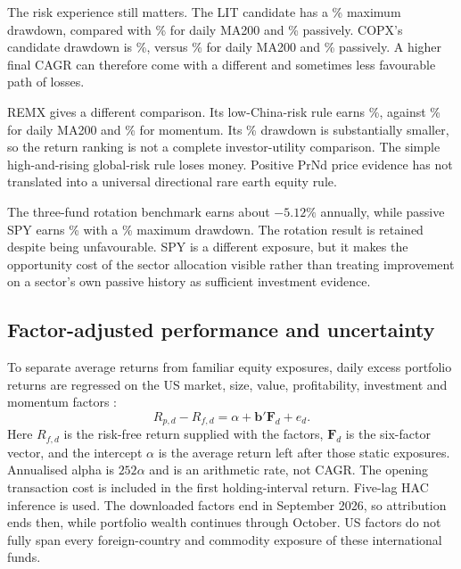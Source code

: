 The risk experience still matters. The LIT candidate has a \OosLitAvoidDrawdown\% maximum drawdown, compared with \OosLitDailyMADrawdown\% for daily MA200 and \OosLitPassiveDrawdown\% passively. COPX's candidate drawdown is \OosCopxAvoidDrawdown\%, versus \OosCopxDailyMADrawdown\% for daily MA200 and \OosCopxPassiveDrawdown\% passively. A higher final CAGR can therefore come with a different and sometimes less favourable path of losses.


REMX gives a different comparison. Its low-China-risk rule earns \OosRemxLowCagr\%, against \OosRemxDailyMACagr\% for daily MA200 and \OosRemxMomentumCagr\% for momentum. Its \OosRemxLowDrawdown\% drawdown is substantially smaller, so the return ranking is not a complete investor-utility comparison. The simple high-and-rising global-risk rule loses money. Positive PrNd price evidence has not translated into a universal directional rare earth equity rule.

The three-fund rotation benchmark earns about $-5.12\%$ annually, while passive SPY earns \OosSpyPassiveCagr\% with a \OosSpyPassiveDrawdown\% maximum drawdown. The rotation result is retained despite being unfavourable. SPY is a different exposure, but it makes the opportunity cost of the sector allocation visible rather than treating improvement on a sector's own passive history as sufficient investment evidence.

\subsection{Factor-adjusted performance and uncertainty}

To separate average returns from familiar equity exposures, daily excess portfolio returns are regressed on the US market, size, value, profitability, investment and momentum factors \citep{fama2015,french2026}:
\begin{equation}
R_{p,d}-R_{f,d}=\alpha+\symbf{b}'\symbf{F}_d+e_d.
\label{eq:alpha}
\end{equation}
Here $R_{f,d}$ is the risk-free return supplied with the factors, $\symbf{F}_d$ is the six-factor vector, and the intercept $\alpha$ is the average return left after those static exposures. Annualised alpha is $252\alpha$ and is an arithmetic rate, not CAGR. The opening transaction cost is included in the first holding-interval return. Five-lag HAC inference is used. The downloaded factors end in September 2026, so attribution ends then, while portfolio wealth continues through October. US factors do not fully span every foreign-country and commodity exposure of these international funds.

